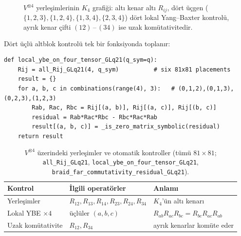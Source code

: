 \documentclass[12pt,a4paper,fleqn]{report}
\newcommand{\normalsemi}{;}
\newcommand{\normalsemi}{\begingroup\semicolonfont;\endgroup}
\numberwithin{equation}{chapter}
\theoremstyle{plain}
\theoremstyle{definition}
\begin{document}
\begin{figure}[h]
\centering
{}
\caption{$V^{\otimes 4}$ yerleşimlerinin $K_4$ grafiği: altı kenar altı $R_{ij}$,
dört üçgen ($\{1,2,3\},\{1,2,4\},\{1,3,4\},\{2,3,4\}$) dört lokal Yang--Baxter
kontrolü, ayrık kenar çifti $(12)\,$--$\,(34)$ ise uzak komütativitedir.}
\label{fig:k4}
\end{figure}

Dört üçlü altblok kontrolü tek bir fonksiyonda toplanır:

\begin{lstlisting}[style=pyblock,caption={$V^{\otimes 4}$ İçindeki Dört Üçlü İçin Lokal YBE Kontrolü}]
def local_ybe_on_four_tensor_GLq21(q_sym=q):
    Rij = all_Rij_GLq21(4, q_sym)          # six 81x81 placements
    result = {}
    for a, b, c in combinations(range(4), 3):   # (0,1,2),(0,1,3),(0,2,3),(1,2,3)
        Rab, Rac, Rbc = Rij[(a, b)], Rij[(a, c)], Rij[(b, c)]
        residual = Rab*Rac*Rbc - Rbc*Rac*Rab
        result[(a, b, c)] = _is_zero_matrix_symbolic(residual)
    return result
\end{lstlisting}

\begin{table}[h]
\centering
\small
\caption[$V^{\otimes 4}$ üzerindeki yerleşimler ve otomatik kontroller.]{$V^{\otimes 4}$ üzerindeki yerleşimler ve otomatik kontroller (tümü
$81\times 81$\normalsemi{} \texttt{all\_Rij\_GLq21}, \texttt{local\_ybe\_on\_four\_tensor\_GLq21},
\texttt{braid\_far\_commutativity\_residual\_GLq21}).}
\label{tab:vtensor4}
\begin{tabularx}{\textwidth}{@{}l l X@{}}
\toprule
Kontrol & İlgili operatörler & Anlamı \\
\midrule
Yerleşimler & $R_{12},R_{13},R_{14},R_{23},R_{24},R_{34}$ & $K_4$'ün altı kenarı \\
\addlinespace[1pt]
Lokal YBE $\times 4$ & üçlüler $(a,b,c)$ & $R_{ab}R_{ac}R_{bc}=R_{bc}R_{ac}R_{ab}$ \\
\addlinespace[1pt]
Uzak komütativite & $R_{12},R_{34}$ & ayrık kenarlar komüte eder \\
\bottomrule
\end{tabularx}
\end{table}
\end{document}
